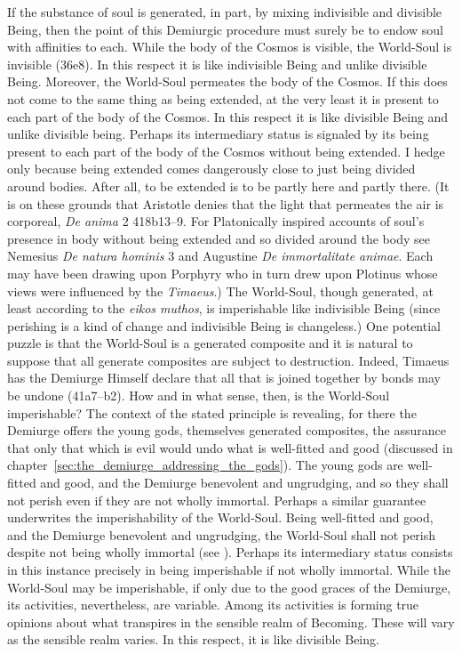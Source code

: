If the substance of soul is generated, in part, by mixing indivisible and divisible Being, then the point of this Demiurgic procedure must surely be to endow soul with affinities to each. While the body of the Cosmos is visible, the World-Soul is invisible (36e8). In this respect it is like indivisible Being and unlike divisible Being. Moreover, the World-Soul permeates the body of the Cosmos. If this does not come to the same thing as being extended, at the very least it is present to each part of the body of the Cosmos. In this respect it is like divisible Being and unlike divisible being. Perhaps its intermediary status is signaled by its being present to each part of the body of the Cosmos without being extended. I hedge only because being extended comes dangerously close to just being divided around bodies. After all, to be extended is to be partly here and partly there. (It is on these grounds that Aristotle denies that the light that permeates the air is corporeal, \emph{De anima} 2 418b13--9. For Platonically inspired accounts of soul's presence in body without being extended and so divided around the body see Nemesius \emph{De natura hominis} 3 and Augustine \emph{De immortalitate animae}. Each may have been drawing upon Porphyry who in turn drew upon Plotinus whose views were influenced by the \emph{Timaeus}.) The World-Soul, though generated, at least according to the \emph{eikos muthos}, is imperishable like indivisible Being (since perishing is a kind of change and indivisible Being is changeless.) One potential puzzle is that the World-Soul is a generated composite and it is natural to suppose that all generate composites are subject to destruction. Indeed, Timaeus has the Demiurge Himself declare that all that is joined together by bonds may be undone (41a7--b2). How and in what sense, then, is the World-Soul imperishable? The context of the stated principle is revealing, for there the Demiurge offers the young gods, themselves generated composites, the assurance that only that which is evil would undo what is well-fitted and good (discussed in chapter~\ref{sec:the_demiurge_addressing_the_gods}). The young gods are well-fitted and good, and the Demiurge benevolent and ungrudging, and so they shall not perish even if they are not wholly immortal. Perhaps a similar guarantee underwrites the imperishability of the World-Soul. Being well-fitted and good, and the Demiurge benevolent and ungrudging, the World-Soul shall not perish despite not being wholly immortal (see \citealt{Betegh:2019fq}). Perhaps its intermediary status consists in this instance precisely in being imperishable if not wholly immortal. While the World-Soul may be imperishable, if only due to the good graces of the Demiurge, its activities, nevertheless, are variable. Among its activities is forming true opinions about what transpires in the sensible realm of Becoming. These will vary as the sensible realm varies. In this respect, it is like divisible Being.

